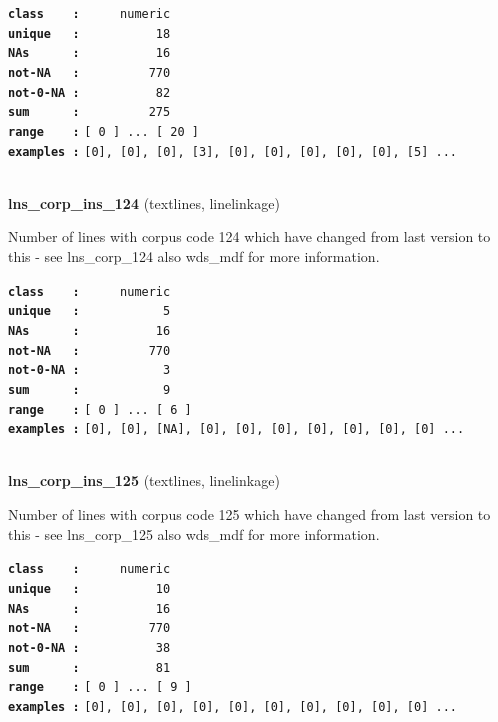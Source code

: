 \documentclass[]{article}
\begin{document}
\textbf{\texttt{class\ \ \ \ :}} \texttt{~~~~~numeric}\\
\textbf{\texttt{unique\ \ \ :}} \texttt{~~~~~~~~~~18}\\
\textbf{\texttt{NAs\ \ \ \ \ \ :}} \texttt{~~~~~~~~~~16}\\
\textbf{\texttt{not-NA\ \ \ :}} \texttt{~~~~~~~~~770}\\
\textbf{\texttt{not-0-NA\ :}} \texttt{~~~~~~~~~~82}\\
\textbf{\texttt{sum\ \ \ \ \ \ :}} \texttt{~~~~~~~~~275}\\
\textbf{\texttt{range\ \ \ \ :}}
\texttt{{[}\ 0\ {]}\ ...\ {[}\ 20\ {]}}\\
\textbf{\texttt{examples\ :}}
\texttt{{[}0{]},\ {[}0{]},\ {[}0{]},\ {[}3{]},\ {[}0{]},\ {[}0{]},\ {[}0{]},\ {[}0{]},\ {[}0{]},\ {[}5{]}\ ...}\\

~

\textbf{lns\_corp\_ins\_124} (textlines, linelinkage)

Number of lines with corpus code 124 which have changed from last
version to this - see lns\_corp\_124 also wds\_mdf for more information.

\textbf{\texttt{class\ \ \ \ :}} \texttt{~~~~~numeric}\\
\textbf{\texttt{unique\ \ \ :}} \texttt{~~~~~~~~~~~5}\\
\textbf{\texttt{NAs\ \ \ \ \ \ :}} \texttt{~~~~~~~~~~16}\\
\textbf{\texttt{not-NA\ \ \ :}} \texttt{~~~~~~~~~770}\\
\textbf{\texttt{not-0-NA\ :}} \texttt{~~~~~~~~~~~3}\\
\textbf{\texttt{sum\ \ \ \ \ \ :}} \texttt{~~~~~~~~~~~9}\\
\textbf{\texttt{range\ \ \ \ :}}
\texttt{{[}\ 0\ {]}\ ...\ {[}\ 6\ {]}}\\
\textbf{\texttt{examples\ :}}
\texttt{{[}0{]},\ {[}0{]},\ {[}NA{]},\ {[}0{]},\ {[}0{]},\ {[}0{]},\ {[}0{]},\ {[}0{]},\ {[}0{]},\ {[}0{]}\ ...}\\

~

\textbf{lns\_corp\_ins\_125} (textlines, linelinkage)

Number of lines with corpus code 125 which have changed from last
version to this - see lns\_corp\_125 also wds\_mdf for more information.

\textbf{\texttt{class\ \ \ \ :}} \texttt{~~~~~numeric}\\
\textbf{\texttt{unique\ \ \ :}} \texttt{~~~~~~~~~~10}\\
\textbf{\texttt{NAs\ \ \ \ \ \ :}} \texttt{~~~~~~~~~~16}\\
\textbf{\texttt{not-NA\ \ \ :}} \texttt{~~~~~~~~~770}\\
\textbf{\texttt{not-0-NA\ :}} \texttt{~~~~~~~~~~38}\\
\textbf{\texttt{sum\ \ \ \ \ \ :}} \texttt{~~~~~~~~~~81}\\
\textbf{\texttt{range\ \ \ \ :}}
\texttt{{[}\ 0\ {]}\ ...\ {[}\ 9\ {]}}\\
\textbf{\texttt{examples\ :}}
\texttt{{[}0{]},\ {[}0{]},\ {[}0{]},\ {[}0{]},\ {[}0{]},\ {[}0{]},\ {[}0{]},\ {[}0{]},\ {[}0{]},\ {[}0{]}\ ...}\\
\end{document}
